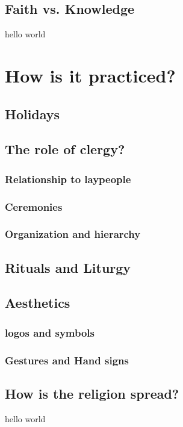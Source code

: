 \documentclass[12pt, letterpaper]{article}
\begin{document}
\subsection{Faith vs. Knowledge}

hello world

\section{How is it practiced?}

\subsection{Holidays}

\subsection{The role of clergy?}

\subsubsection{Relationship to laypeople}

\subsubsection{Ceremonies}

\subsubsection{Organization and hierarchy}

\subsection{Rituals and Liturgy}

\subsection{Aesthetics}

\subsubsection{logos and symbols}

\subsubsection{Gestures and Hand signs}

\subsection{How is the religion spread?}



hello world

  
  
\end{document}
